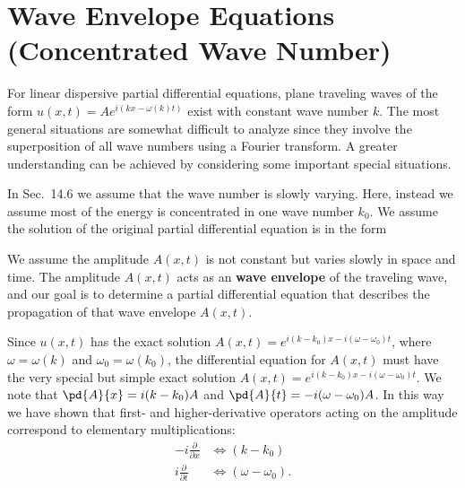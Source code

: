 \section{Wave Envelope Equations (Concentrated Wave Number)}
\label{sec:wave-envelope}

For linear dispersive partial differential equations, plane traveling waves of the form $u(x,t) = Ae^{i(kx - \omega(k)t)}$ exist with constant wave number $k$.  The most general situations are somewhat difficult to analyze since they involve the superposition of all wave numbers using a Fourier transform.  A greater understanding can be achieved by considering some important special situations.

In Sec.~14.6 we assume that the wave number is slowly varying.  Here, instead we assume most of the energy is concentrated in one wave number $k_0$.  We assume the solution of the original partial differential equation is in the form

We assume the amplitude $A(x,t)$ is not constant but varies slowly in space and time.  The amplitude $A(x,t)$ acts as an \textbf{wave envelope} of the traveling wave, and our goal is to determine a partial differential equation that describes the propagation of that wave envelope $A(x,t)$.

Since $u(x,t)$ has the exact solution $A(x,t) = e^{i(k-k_0)x - i(\omega - \omega_0)t}$, where $\omega = \omega(k)$ and $\omega_0 = \omega(k_0)$, the differential equation for $A(x,t)$ must have the very special but simple exact solution $A(x,t) = e^{i(k-k_0)x - i(\omega-\omega_0)t}$.  We note that $\pd{A}{x} = i(k - k_0)A$ and $\pd{A}{t} = -i(\omega - \omega_0)A$.  In this way we have shown that first- and higher-derivative operators acting on the amplitude correspond to elementary multiplications:
\begin{align}
\label{eq:14.7.2}
-i\frac{\partial}{\partial x} &\iff (k - k_0) \\
\label{eq:14.7.3}
i\frac{\partial}{\partial t} &\iff (\omega - \omega_0).
\end{align}

